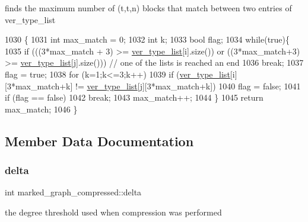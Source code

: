 finds the maximum number of (t,t\textquotesingle{},n) blocks that match between two entries of ver\+\_\+type\+\_\+list 


\begin{DoxyCode}
1030                                                         \{
1031   \textcolor{keywordtype}{int} max\_match = 0;
1032   \textcolor{keywordtype}{int} k;
1033   \textcolor{keywordtype}{bool} flag;
1034   \textcolor{keywordflow}{while}(\textcolor{keyword}{true})\{
1035     \textcolor{keywordflow}{if} (((3*max\_match + 3) >= \hyperlink{classmarked__graph__compressed_af2e3e55223d436628a02758dfae88493}{ver\_type\_list}[i].size()) or ((3*max\_match+3) >= 
      \hyperlink{classmarked__graph__compressed_af2e3e55223d436628a02758dfae88493}{ver\_type\_list}[j].size())) \textcolor{comment}{// one of the lists is reached an end}
1036       \textcolor{keywordflow}{break};
1037     flag = \textcolor{keyword}{true};
1038     \textcolor{keywordflow}{for} (k=1;k<=3;k++)
1039       \textcolor{keywordflow}{if} (\hyperlink{classmarked__graph__compressed_af2e3e55223d436628a02758dfae88493}{ver\_type\_list}[i][3*max\_match+k] != \hyperlink{classmarked__graph__compressed_af2e3e55223d436628a02758dfae88493}{ver\_type\_list}[j][3*max\_match+k])
1040         flag = \textcolor{keyword}{false};
1041     \textcolor{keywordflow}{if} (flag == \textcolor{keyword}{false})
1042       \textcolor{keywordflow}{break};
1043     max\_match++;
1044   \}
1045   \textcolor{keywordflow}{return} max\_match;
1046 \}
\end{DoxyCode}


\subsection{Member Data Documentation}
\mbox{\label{classmarked__graph__compressed_a8b2aaac68e9332ddc78d88eb60b323a7}} 
\subsubsection{\texorpdfstring{delta}{delta}}
{\footnotesize\ttfamily int marked\+\_\+graph\+\_\+compressed\+::delta}



the degree threshold used when compression was performed 

